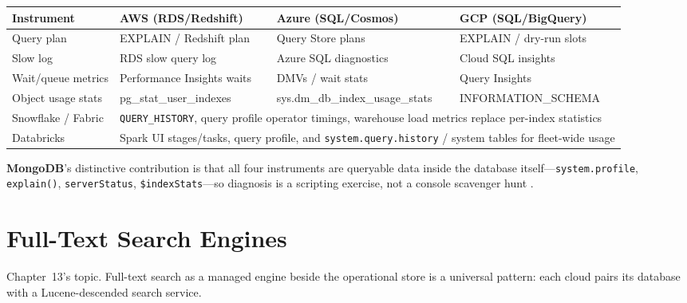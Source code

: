 \begin{center}
\footnotesize
\begin{tabular}{@{}p{2.9cm}p{3.0cm}p{3.0cm}p{3.0cm}@{}}
\toprule
\textbf{Instrument} & \textbf{AWS (RDS/Redshift)} & \textbf{Azure (SQL/Cosmos)} & \textbf{GCP (SQL/BigQuery)} \\
\midrule
Query plan & EXPLAIN / Redshift plan & Query Store plans & EXPLAIN / dry-run slots \\
Slow log & RDS slow query log & Azure SQL diagnostics & Cloud SQL insights \\
Wait/queue metrics & Performance Insights waits & DMVs / wait stats & Query Insights \\
Object usage stats & pg\_stat\_user\_indexes & sys.dm\_db\_index\_usage\_stats & INFORMATION\_SCHEMA \\
\addlinespace
Snowflake / Fabric & \multicolumn{3}{l}{\texttt{QUERY\_HISTORY}, query profile operator timings, warehouse load metrics replace per-index statistics} \\
Databricks & \multicolumn{3}{l}{Spark UI stages/tasks, query profile, and \texttt{system.query.history} / system tables for fleet-wide usage} \\
\bottomrule
\end{tabular}
\end{center}

\noindent \textbf{MongoDB}'s distinctive contribution is that all four instruments are queryable
data inside the database itself---\texttt{system.profile}, \texttt{explain()},
\texttt{serverStatus}, \texttt{\$indexStats}---so diagnosis is a scripting exercise, not a console
scavenger hunt \cite{mongodbProfilerDocs,mongodbExplainDocs}.

\section{Full-Text Search Engines}
%
Chapter~13's topic. Full-text search as a managed engine beside the operational store is a
universal pattern: each cloud pairs its database with a Lucene-descended search service.


